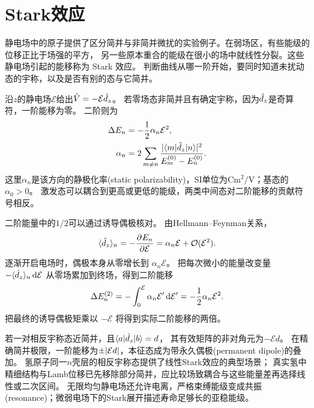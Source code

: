 \section{Stark效应}
\label{sec:stark}
静电场中的原子提供了区分简并与非简并微扰的实验例子。在弱场区，有些能级的位移正比于场强的平方，
另一些原本重合的能级在很小的场中就线性分裂。这些静电场引起的能移称为 Stark 效应。
判断曲线从哪一阶开始，要同时知道未扰动态的宇称，以及是否有别的态与它简并。

沿$z$的静电场$\mathcal E$给出$\hat{V} = -\mathcal E \hat{d}_z$。
若零场态非简并且有确定宇称，因为$\hat{d}_z$是奇算符，一阶能移为零。
二阶则为
\begin{subequations}
    \begin{align}
        \Delta E_n &= -\frac12\alpha_n\mathcal E^2,\\
        \alpha_n &= 2\sum_{m\ne n}\frac{\lvert\langle m\vert\hat{d}_z\vert n\rangle\rvert^2}{E_m^{(0)} - E_n^{(0)}}.
    \end{align}
\end{subequations}
这里$\alpha_n$是该方向的静极化率(static polarizability)，SI单位为$\unit{\coulomb\metre\squared\per\volt}$；基态的$\alpha_0 > 0$。
激发态可以耦合到更高或更低的能级，两类中间态对二阶能移的贡献符号相反。

二阶能量中的$1/2$可以通过诱导偶极核对。
由Hellmann--Feynman关系，
\begin{equation}
    \langle\hat{d}_z\rangle_n = -\frac{\partial^{}E_n}{\partial{\mathcal E}^{}}
        = \alpha_n\mathcal E + \mathcal{O}(\mathcal E^2).
\end{equation}
逐渐开启电场时，偶极本身从零增长到 $\alpha_n\mathcal E$。
把每次微小的能量改变量 $-\langle\hat{d}_z\rangle_n\mathop{}\!\mathrm{d}\mathcal E$ 从零场累加到终场，得到二阶能移
\[
    \Delta E_n^{(2)} = -\int_0^\mathcal E\alpha_n\mathcal E'\mathop{}\!\mathrm{d}\mathcal E'
    = -\frac12\alpha_n\mathcal E^2 .
\]
把最终的诱导偶极矩乘以 $-\mathcal E$ 将得到实际二阶能移的两倍。

若一对相反宇称态近简并，且$\langle a\vert\hat{d}_z\vert b\rangle = d$，
其有效矩阵的非对角元为$-\mathcal E d$。
在精确简并极限，一阶能移为$\pm\lvert\mathcal E d\rvert$，本征态成为带永久偶极(permanent dipole)的叠加。
氢原子同一$n$壳层的相反宇称态提供了线性Stark效应的典型场景；
真实氢中精细结构与Lamb位移已先移除部分简并，应比较场致耦合与这些能量差再选择线性或二次区间。
无限均匀静电场还允许电离，严格束缚能级变成共振(resonance)；微弱电场下的Stark展开描述寿命足够长的亚稳能级。

